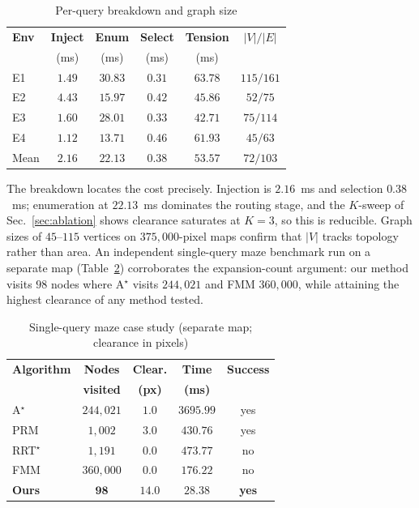 \documentclass[conference]{IEEEtran}
\begin{document}
\begin{table}[htbp]
\caption{Per-query breakdown and graph size}
\label{tab:breakdown}
\begin{center}
\begin{tabular}{@{}lccccc@{}}
\toprule
\textbf{Env} & \textbf{Inject} & \textbf{Enum} & \textbf{Select} & \textbf{Tension} & \textbf{$|V|/|E|$} \\
 & (ms) & (ms) & (ms) & (ms) & \\ \midrule
E1 & $1.49$ & $30.83$ & $0.31$ & $63.78$ & $115/161$ \\
E2 & $4.43$ & $15.97$ & $0.42$ & $45.86$ & $52/75$ \\
E3 & $1.60$ & $28.01$ & $0.33$ & $42.71$ & $75/114$ \\
E4 & $1.12$ & $13.71$ & $0.46$ & $61.93$ & $45/63$ \\ \midrule
Mean & $2.16$ & $22.13$ & $0.38$ & $53.57$ & $72/103$ \\ \bottomrule
\end{tabular}
\end{center}
\end{table}
The breakdown locates the cost precisely. Injection is $2.16$~ms and selection $0.38$~ms; enumeration at $22.13$~ms dominates the routing stage, and the $K$-sweep of Sec.~\ref{sec:ablation} shows clearance saturates at $K=3$, so this is reducible. Graph sizes of $45$--$115$ vertices on $375{,}000$-pixel maps confirm that $|V|$ tracks topology rather than area.
An independent single-query maze benchmark run on a separate map (Table~\ref{tab:maze}) corroborates the expansion-count argument: our method visits $98$ nodes where A$^\star$ visits $244{,}021$ and FMM $360{,}000$, while attaining the highest clearance of any method tested.
\begin{table}[htbp]
\caption{Single-query maze case study (separate map; clearance in pixels)}
\label{tab:maze}
\begin{center}
\begin{tabular}{@{}lcccc@{}}
\toprule
\textbf{Algorithm} & \textbf{Nodes} & \textbf{Clear.} & \textbf{Time} & \textbf{Success} \\
 & \textbf{visited} & \textbf{(px)} & \textbf{(ms)} & \\ \midrule
A$^\star$ & $244{,}021$ & $1.0$ & $3695.99$ & yes \\
PRM & $1{,}002$ & $3.0$ & $430.76$ & yes \\
RRT$^\star$ & $1{,}191$ & $0.0$ & $473.77$ & no \\
FMM & $360{,}000$ & $0.0$ & $176.22$ & no \\
\textbf{Ours} & $\mathbf{98}$ & $\mathbf{14.0}$ & $\mathbf{28.38}$ & \textbf{yes} \\ \bottomrule
\end{tabular}
\end{center}
\end{table}
\end{document}
